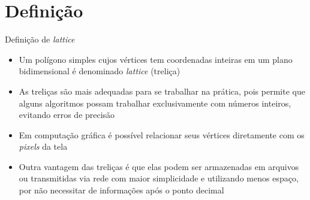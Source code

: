 \section{Definição}

\begin{frame}[fragile]{Definição de {\it lattice}}

    \begin{itemize}
        \item Um polígono simples cujos vértices tem coordenadas inteiras em um plano 
            bidimensional é denominado {\it lattice} (treliça)

        \item As treliças são mais adequadas para se trabalhar na prática, pois permite que
            alguns algoritmos possam trabalhar exclusivamente com números inteiros, 
            evitando erros de precisão

        \item Em computação gráfica é possível relacionar seus vértices diretamente com os
            \textit{pixels} da tela

        \item Outra vantagem das treliças é que elas podem ser armazenadas em arquivos ou
            transmitidas via rede com maior simplicidade e utilizando menos espaço, por
            não necessitar de informações após o ponto decimal
        
    \end{itemize}

\end{frame}
